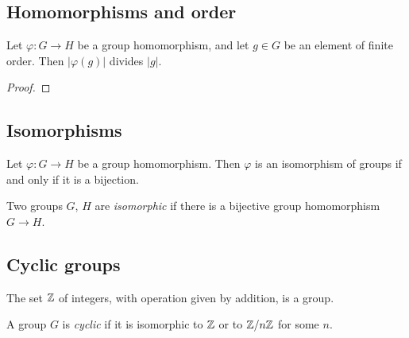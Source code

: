 \subsection{Homomorphisms and order}
\label{subsec:groups:homomorphisms-and-order}

\begin{proposition}
  \label{prop:groups:hom-order-divides}
  Let $\varphi : G \to H$ be a group homomorphism, and let $g \in G$
  be an element of finite order. Then $|\varphi(g)|$ divides $|g|$.
\end{proposition}
\begin{proof}
\end{proof}

\subsection{Isomorphisms}
\label{subsec:groups:isomorphisms}

\begin{proposition}
  \label{prop:groups:iso-iff-bijection}
  Let $\varphi : G \to H$ be a group homomorphism. Then $\varphi$ is
  an isomorphism of groups if and only if it is a bijection.
\end{proposition}

\begin{definition}
  \label{def:groups:isomorphic-groups}
  \leanok
  Two groups $G$, $H$ are \emph{isomorphic} if there is a bijective
  group homomorphism $G \to H$.
\end{definition}

\subsection{Cyclic groups}
\label{subsec:groups:cyclic-groups-revisited}

\begin{definition}
  \label{def:groups:int-group}
  \leanok
  The set $\mathbb{Z}$ of integers, with operation given by addition, is a
  group.
\end{definition}

\begin{definition}
  \label{def:groups:is-cyclic-group}
  \leanok
  A group $G$ is \emph{cyclic} if it is isomorphic to $\mathbb{Z}$ or to
  $\mathbb{Z}/n\mathbb{Z}$ for some $n$.
\end{definition}

